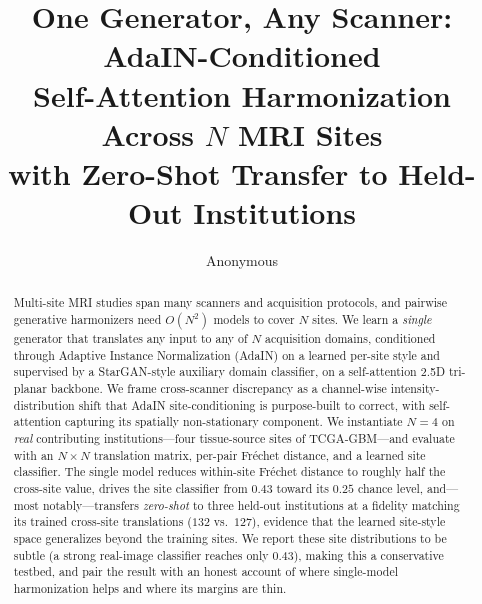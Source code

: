 \documentclass[runningheads]{llncs}
\begin{document}
\title{One Generator, Any Scanner: AdaIN-Conditioned\\
Self-Attention Harmonization Across $N$ MRI Sites\\with Zero-Shot Transfer to Held-Out Institutions}


\author{Anonymous}

\maketitle

\begin{abstract}
Multi-site MRI studies span many scanners and acquisition protocols, and
pairwise generative harmonizers need $O(N^2)$ models to cover $N$ sites. We learn
a \emph{single} generator that translates any input to any of $N$ acquisition
domains, conditioned through Adaptive Instance Normalization (AdaIN) on a learned
per-site style and supervised by a StarGAN-style auxiliary domain classifier, on
a self-attention 2.5D tri-planar backbone. We frame cross-scanner discrepancy as
a channel-wise intensity-distribution shift that AdaIN site-conditioning is
purpose-built to correct, with self-attention capturing its spatially
non-stationary component. We instantiate $N{=}4$ on \emph{real} contributing
institutions---four tissue-source sites of TCGA-GBM---and evaluate with an
$N{\times}N$ translation matrix, per-pair Fr\'echet distance, and a learned
site classifier. The single model reduces within-site Fr\'echet distance to
roughly half the cross-site value, drives the site classifier from $0.43$ toward
its $0.25$ chance level, and---most notably---transfers \emph{zero-shot} to three
held-out institutions at a fidelity matching its trained cross-site translations
($132$ vs.\ $127$), evidence that the learned site-style space generalizes beyond
the training sites. We report these site distributions to be subtle (a strong
real-image classifier reaches only $0.43$), making this a conservative testbed,
and pair the result with an honest account of where single-model harmonization
helps and where its margins are thin.
\end{abstract}
\end{document}
